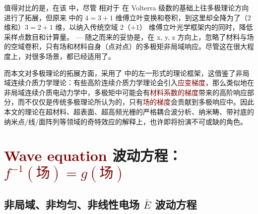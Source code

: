 值得对比的是，在该  中，尽管  相对于  在 Volterra 级数的基础上往多极理论方向进行了拓展，但原来  中的 $4=3+1$ 维傅立叶变换和卷积，到这里却全降为了（$2$ 维和）$3=2+1$ 维，以纳入传统空域 $2$（$+1$） 维傅立叶光学框架内的同时，降低采样点数目和计算量。 ---  随之而来的妥协是，在 x, y, z 方向上，忽略了材料与场的空域卷积，只有场和材料自身（点对点）的多极矩非局域响应。尽管这在很大程度上，对很多场景，都已经适用了。

而本文对多极理论的拓展方面，采用了  中的左一形式的理论框架，这借鉴了非局域连续介质力学理论：有些高阶连续介质力学理论会引入\textcolor{Maroon}{应变梯度}\cite{LiuYingHuaGaoJieLianXuJieZhiLiLun2024}，那么类似地在非局域连续介质电动力学中，多极矩中可能会有\textcolor{Maroon}{材料系数的梯度}带来的高阶响应部分，而不仅仅是传统多极理论所认为的，只有\textcolor{Maroon}{场的梯度}会贡献到多极响应中。因此本文的理论在超材料、超表面、超高频光栅的严格耦合波分析、纳米畴、带衬底的纳米点/线/面阵列等领域的奇特效应的解释上，也许即将扮演不可或缺的角色。

\section{\textcolor{Maroon}{Wave equation} 波动方程：\textcolor{Maroon}{$f^{-1}(\text{场}) = g(\text{场})$}}\label{sec:waveq}

\vspace*{-6.0em}

\subsection{非局域、非均匀、非线性电场 $\bar{E}$ 波动方程}\label{ssec:Exp-waveq}

